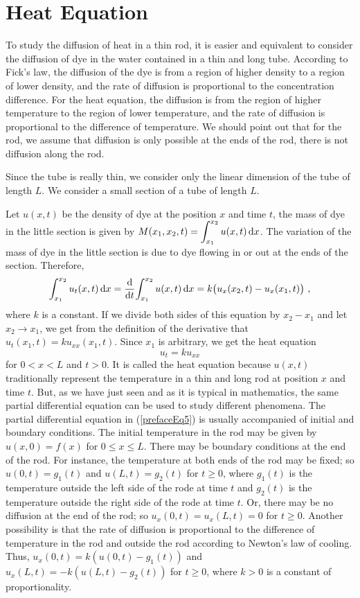\section*{Heat Equation}

To study the diffusion of heat in a thin rod, it is easier and
equivalent to consider the diffusion of dye in the water contained in a
thin and long tube.  According to Fick's law, the diffusion of the dye
is from a region of higher density to a region of lower density, and
the rate of diffusion is proportional to the concentration difference.
For the heat equation, the diffusion is from the region of higher
temperature to the region of lower temperature, and the rate of
diffusion is proportional to the difference of temperature.
We should point out that for the rod, we assume that diffusion is only
possible at the ends of the rod, there is not diffusion along the rod.

Since the tube is really thin, we consider only the linear dimension
of the tube of length $L$.  We consider a small section of a tube of
length $L$.


Let $u(x,t)$ be the density of dye at the position $x$ and time $t$,
the mass of dye in the little section is given by
$\displaystyle M(x_1,x_2,t) = \int_{x_1}^{x_2} u(x,t) \dx{x}$.
The variation of the mass of dye in the little section is
due to dye flowing in or out at the ends of the section.  Therefore,
\[
  \int_{x_1}^{x_2} u_t(x,t) \dx{x} 
= \dfdx{\int_{x_1}^{x_2} u(x,t) \dx{x}}{t} 
= k \big( u_x(x_2,t) - u_x(x_1,t) \big) \ ,
\]
where $k$ is a constant.  If we divide both sides of this equation by
$x_2-x_1$ and let $x_2 \to x_1$, we get from the definition of the
derivative that $\displaystyle u_t(x_1,t) = k u_{xx}(x_1,t)$.
Since $x_1$ is arbitrary, we get the heat equation
\begin{equation} \label{prefaceEq5}
  u_t = k u_{xx} \tag{$5$}
\end{equation}
for $0 < x < L$ and $t > 0$.  It is called the heat equation because
$u(x,t)$ traditionally represent the temperature in a thin and long
rod at position $x$ and time $t$.  But, as we have just seen and as it
is typical in mathematics, the same partial differential equation can
be used to study different phenomena. The partial differential
equation in (\ref{prefaceEq5}) is usually accompanied of initial and
boundary conditions.   The initial temperature in the rod may be given
by $u(x,0) = f(x)$ for $0 \leq x \leq L$.  There may be boundary
conditions at the end of the rod.  For instance, the temperature at
both ends of the rod may be fixed; so $u(0,t) = g_1(t)$ and
$u(L,t) = g_2(t)$ for $t \geq 0$, where $g_1(t)$ is the temperature
outside the left side of the rode at time $t$ and $g_2(t)$ is the temperature
outside the right side of the rode at time $t$.  Or, there may be no
diffusion at the end of the rod; so $u_x(0,t) = u_x(L,t) = 0$ for
$t \geq 0$.  Another possibility is that
the rate of diffusion is proportional to the difference of temperature
in the rod and outside the rod according to Newton's law of cooling.
Thus, $u_x(0,t) = k (u(0,t) - g_1(t))$ and 
$u_x(L,t) = -k (u(L,t) - g_2(t))$ for $t \geq 0$, where $k>0$ is a
constant of proportionality.

